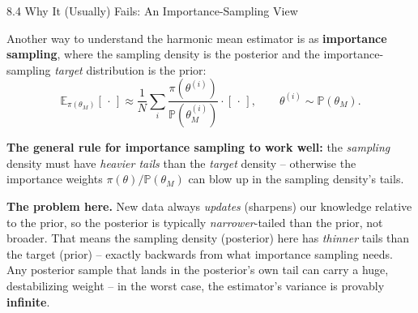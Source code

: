 \documentclass[aspectratio=169,10pt]{beamer}
\begin{document}
\begin{frame}[allowframebreaks]{8.4 Why It (Usually) Fails: An Importance-Sampling View}

Another way to understand the harmonic mean estimator is as \textbf{importance sampling}, where the sampling density is the posterior and the importance-sampling \emph{target} distribution is the prior:
\[
\mathbb{E}_{\pi(\theta_M)}[\, \cdot \, ] \approx \frac{1}{N}\sum_i \frac{\pi(\theta^{(i)})}{\mathbb{P}(\theta^{(i)}_M)} \cdot [\, \cdot \, ], \qquad \theta^{(i)} \sim \mathbb{P}(\theta_M).
\]

\textbf{The general rule for importance sampling to work well:} the \emph{sampling} density must have \emph{heavier tails} than the \emph{target} density -- otherwise the importance weights $\pi(\theta)/\mathbb{P}(\theta_M)$ can blow up in the sampling density's tails.

\textbf{The problem here.} New data always \emph{updates} (sharpens) our knowledge relative to the prior, so the posterior is typically \emph{narrower}-tailed than the prior, not broader. That means the sampling density (posterior) here has \emph{thinner} tails than the target (prior) -- exactly backwards from what importance sampling needs. Any posterior sample that lands in the posterior's own tail can carry a huge, destabilizing weight -- in the worst case, the estimator's variance is provably \textbf{infinite}.

\end{frame}
\end{document}
